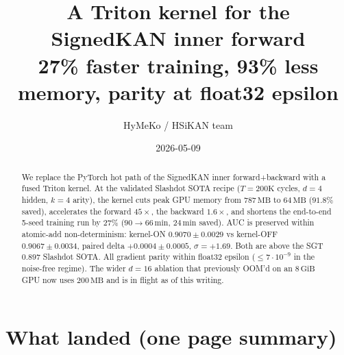 \documentclass[11pt,a4paper]{article}
\title{\bfseries A Triton kernel for the SignedKAN inner forward
       \\\large 27\% faster training, 93\% less memory, parity at
       float32 epsilon}
\author{HyMeKo / HSiKAN team}
\date{2026-05-09}
\begin{document}
\maketitle

\begin{abstract}
\noindent We replace the PyTorch hot path of the SignedKAN inner
forward+backward with a fused Triton kernel.  At the validated
Slashdot SOTA recipe ($T = 200\text{K}$ cycles, $d = 4$ hidden,
$k = 4$ arity), the kernel cuts peak GPU memory from
$787\,\text{MB}$ to $64\,\text{MB}$ ($91.8\%$ saved), accelerates
the forward $45\times$, the backward $1.6\times$, and shortens the
end-to-end 5-seed training run by $27\%$ ($90{\to}66\,\text{min}$,
$24\,\text{min}$ saved).  AUC is preserved within atomic-add
non-determinism: kernel-ON $0.9070 \pm 0.0029$ vs kernel-OFF
$0.9067 \pm 0.0034$, paired delta $+0.0004 \pm 0.0005$, $\sigma{=}{+}1.69$.
Both are above the SGT~$0.897$ Slashdot SOTA.  All gradient parity
within float32 epsilon ($\le 7 \cdot 10^{-9}$ in the noise-free
regime).  The wider $d{=}16$ ablation that previously OOM'd on an
$8\,\text{GiB}$ GPU now uses $200\,\text{MB}$ and is in flight as of
this writing.
\end{abstract}

\section{What landed (one page summary)}
\end{document}
